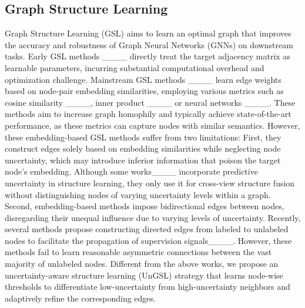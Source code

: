 \subsection{Graph Structure Learning}
Graph Structure Learning (GSL) aims to learn an optimal graph that improves the accuracy and robustness of Graph Neural Networks (GNNs) on downstream tasks.
Early GSL methods ____ directly treat the target adjacency matrix as learnable parameters, incurring substantial
computational overhead and optimization challenge.
Mainstream GSL methods ____ learn edge weights based on node-pair embedding similarities, employing various metrics such as cosine similarity ____, inner product ____ or neural networks ____.
These methods aim to increase graph homophily and typically achieve state-of-the-art performance, as these metrics can capture nodes with similar semantics.
However, these embedding-based GSL methods suffer from two limitations:
First, they construct edges solely based on embedding similarities while neglecting node uncertainty, which may introduce inferior information that poison the target node's embedding. 
Although some works____ incorporate predictive uncertainty in structure learning, they only use it for cross-view structure fusion without distinguishing nodes of varying uncertainty levels within a graph.
Second, embedding-based methods impose bidirectional edges between nodes, disregarding their unequal influence due to varying levels of uncertainty.
Recently, several methods propose constructing directed edges from labeled to unlabeled nodes to facilitate the propagation of supervision signals____.
However, these methods fail to learn reasonable
asymmetric connections between the vast majority of unlabeled nodes.
Different from the above works, we propose an uncertainty-aware structure learning (UnGSL) strategy that learns node-wise thresholds to differentiate low-uncertainty from high-uncertainty neighbors and adaptively refine the corresponding edges.


